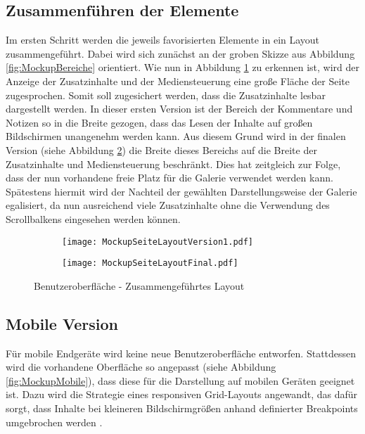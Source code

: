 \subsection{Zusammenführen der Elemente}
Im ersten Schritt werden die jeweils favorisierten Elemente in ein Layout zusammengeführt. Dabei wird sich zunächst an der groben Skizze aus Abbildung \ref{fig:MockupBereiche} orientiert. Wie nun in Abbildung \ref{fig:MockupSeiteLayoutVersion1} zu erkennen ist, wird der Anzeige der Zusatzinhalte und der Mediensteuerung eine große Fläche der Seite zugesprochen. Somit soll zugesichert werden, dass die Zusatzinhalte lesbar dargestellt werden. In dieser ersten Version ist der Bereich der Kommentare und Notizen so in die Breite gezogen, dass das Lesen der Inhalte auf großen Bildschirmen unangenehm werden kann. Aus diesem Grund wird in der finalen Version (siehe Abbildung \ref{fig:MockupSeiteLayoutFinal}) die Breite dieses Bereichs auf die Breite der Zusatzinhalte und Mediensteuerung beschränkt. Dies hat zeitgleich zur Folge, dass der nun vorhandene freie Platz für die Galerie verwendet werden kann. Spätestens hiermit wird der Nachteil der gewählten Darstellungsweise der Galerie egalisiert, da nun ausreichend viele Zusatzinhalte ohne die Verwendung des Scrollbalkens eingesehen werden können.

\begin{figure}[h!]
\begin{subfigure}[c]{\textwidth}
\texttt{[image: MockupSeiteLayoutVersion1.pdf]}
\label{fig:MockupSeiteLayoutVersion1}
\end{subfigure}
\par\bigskip
\begin{subfigure}[c]{\textwidth}
\texttt{[image: MockupSeiteLayoutFinal.pdf]}
\label{fig:MockupSeiteLayoutFinal}
\end{subfigure}
\caption{Benutzeroberfläche - Zusammengeführtes Layout}
\label{fig:MockupSeiteLayout}
\end{figure}

\subsection{Mobile Version}
\label{sub:mobile}
Für mobile Endgeräte wird keine neue Benutzeroberfläche entworfen. Stattdessen wird die vorhandene Oberfläche so angepasst (siehe Abbildung \ref{fig:MockupMobile}), dass diese für die Darstellung auf mobilen Geräten geeignet ist. Dazu wird die Strategie eines responsiven Grid-Layouts angewandt, das dafür sorgt, dass Inhalte bei kleineren Bildschirmgrößen anhand definierter Breakpoints umgebrochen werden \citep{hellichtresponsive}.

